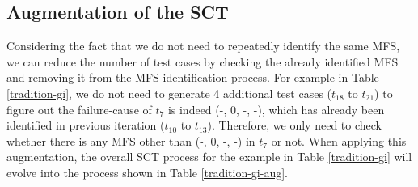 \documentclass[10pt,journal,compsoc]{IEEEtran}
\begin{document}
\subsection{Augmentation of the SCT}

Considering the fact that we do not need to repeatedly identify the same MFS, we can reduce the number of test cases by checking the already identified MFS and removing it from the MFS identification process. For example in Table \ref{tradition-gi}, we do not need to generate 4 additional test cases ($t_{18}$ to $t_{21}$) to figure out the failure-cause of $t_{7}$ is indeed (-, 0, -, -), which has already been identified in previous iteration ($t_{10}$ to $t_{13}$). Therefore, we only need to check whether there is any MFS other than (-, 0, -, -) in $t_{7}$ or not. When applying this augmentation, the overall SCT process for the example in Table \ref{tradition-gi} will evolve into the process shown in Table \ref{tradition-gi-aug}.
\end{document}
